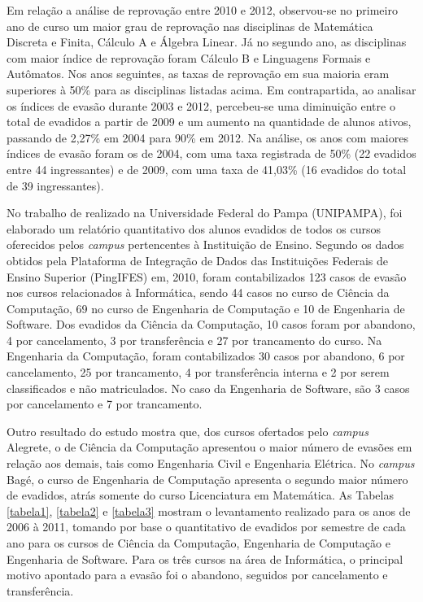 Em relação a análise de reprovação entre 2010 e 2012, observou-se no primeiro ano de curso um maior grau de reprovação nas disciplinas de Matemática Discreta e Finita, Cálculo A  e Álgebra Linear. Já no segundo ano, as disciplinas com maior índice de reprovação foram Cálculo B  e Linguagens Formais e Autômatos. Nos anos seguintes, as taxas de reprovação em sua maioria eram superiores à 50\% para as disciplinas listadas acima. Em contrapartida, ao analisar os índices de evasão durante 2003 e 2012, percebeu-se uma diminuição entre o total de evadidos a partir de 2009 e um aumento na quantidade de alunos ativos, passando de 2,27\% em 2004 para 90\% em 2012. Na análise, os anos com maiores índices de evasão foram os de 2004, com uma taxa registrada de 50\% (22 evadidos entre 44 ingressantes) e de 2009, com uma taxa de 41,03\% (16 evadidos do total de 39 ingressantes).

No trabalho de \citet{jose_andreoli2011} realizado na Universidade Federal do Pampa (UNIPAMPA), foi elaborado um relatório quantitativo dos alunos evadidos de todos os cursos oferecidos pelos \textit{campus} pertencentes à Instituição de Ensino. Segundo os dados obtidos pela Plataforma de Integração de Dados das Instituições Federais de Ensino Superior (PingIFES) em, 2010, foram contabilizados 123 casos de evasão nos cursos relacionados à Informática, sendo 44 casos no curso de Ciência da Computação, 69 no curso de Engenharia de Computação e 10 de Engenharia de Software. Dos evadidos da Ciência da Computação,  10 casos foram por abandono, 4 por cancelamento, 3 por transferência e 27 por trancamento do curso. Na Engenharia da Computação, foram contabilizados 30 casos por abandono, 6 por cancelamento, 25 por trancamento, 4 por transferência interna e 2 por serem classificados e não matriculados.  No caso da Engenharia de Software, são 3 casos por cancelamento e 7 por trancamento. 

Outro resultado do estudo mostra que, dos cursos ofertados pelo \textit{campus} Alegrete, o de Ciência da Computação apresentou o maior número de evasões em relação aos demais, tais como Engenharia Civil e Engenharia Elétrica. No \textit{campus} Bagé, o curso de Engenharia de Computação apresenta o segundo maior número de evadidos, atrás somente do curso Licenciatura em Matemática. As Tabelas \ref{tabela1}, \ref{tabela2} e \ref{tabela3} mostram o levantamento realizado para os anos de 2006 à 2011, tomando por base o quantitativo de evadidos por semestre de cada ano para os cursos de Ciência da Computação, Engenharia de Computação e Engenharia de Software. Para os três cursos na área de Informática, o principal motivo apontado para a evasão foi o abandono, seguidos por cancelamento e transferência.

